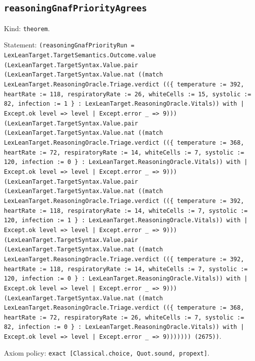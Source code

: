 \documentclass[11pt]{article}
\begin{document}
\subsection*{\texttt{reasoningGnafPriorityAgrees}}
\noindent Kind: \texttt{theorem}.\par
\noindent Statement: \texttt{(reasoningGnafPriorityRun = LexLeanTarget.TargetSemantics.Outcome.value (LexLeanTarget.TargetSyntax.Value.pair (LexLeanTarget.TargetSyntax.Value.nat ((match LexLeanTarget.ReasoningOracle.Triage.verdict ((\{ temperature := 392, heartRate := 118, respiratoryRate := 26, whiteCells := 15, systolic := 82, infection := 1 \} : LexLeanTarget.ReasoningOracle.Vitals)) with | Except.ok level => level | Except.error \_ => 9))) (LexLeanTarget.TargetSyntax.Value.pair (LexLeanTarget.TargetSyntax.Value.nat ((match LexLeanTarget.ReasoningOracle.Triage.verdict ((\{ temperature := 368, heartRate := 72, respiratoryRate := 14, whiteCells := 7, systolic := 120, infection := 0 \} : LexLeanTarget.ReasoningOracle.Vitals)) with | Except.ok level => level | Except.error \_ => 9))) (LexLeanTarget.TargetSyntax.Value.pair (LexLeanTarget.TargetSyntax.Value.nat ((match LexLeanTarget.ReasoningOracle.Triage.verdict ((\{ temperature := 392, heartRate := 118, respiratoryRate := 14, whiteCells := 7, systolic := 120, infection := 1 \} : LexLeanTarget.ReasoningOracle.Vitals)) with | Except.ok level => level | Except.error \_ => 9))) (LexLeanTarget.TargetSyntax.Value.pair (LexLeanTarget.TargetSyntax.Value.nat ((match LexLeanTarget.ReasoningOracle.Triage.verdict ((\{ temperature := 392, heartRate := 118, respiratoryRate := 14, whiteCells := 7, systolic := 120, infection := 0 \} : LexLeanTarget.ReasoningOracle.Vitals)) with | Except.ok level => level | Except.error \_ => 9))) (LexLeanTarget.TargetSyntax.Value.nat ((match LexLeanTarget.ReasoningOracle.Triage.verdict ((\{ temperature := 368, heartRate := 72, respiratoryRate := 26, whiteCells := 7, systolic := 82, infection := 0 \} : LexLeanTarget.ReasoningOracle.Vitals)) with | Except.ok level => level | Except.error \_ => 9))))))) (2675))}.\par
\noindent Axiom policy: \texttt{exact [Classical.choice, Quot.sound, propext]}.\par
\end{document}
